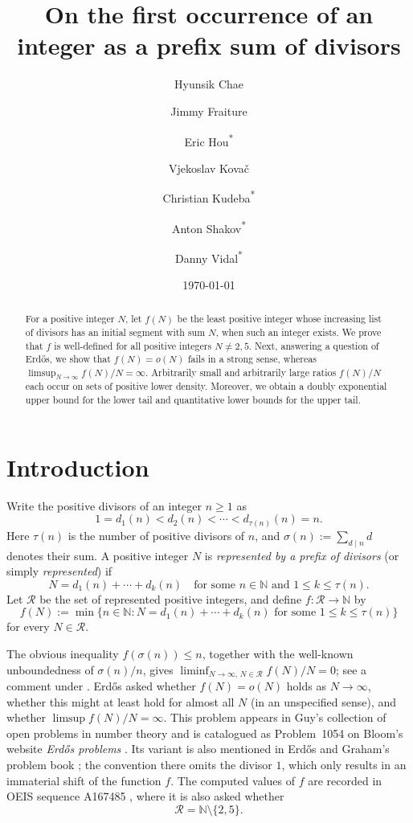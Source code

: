 \documentclass[11pt,letterpaper,reqno]{amsart}
\title{On the first occurrence of an integer as a prefix sum of divisors}
\author[Chae]{Hyunsik Chae}
\author[Fraiture]{Jimmy Fraiture}
\author[Hou]{Eric Hou\textsuperscript{*}}
\author[Kova\v{c}]{Vjekoslav Kova\v{c}}
\author[Kudeba]{Christian Kudeba\textsuperscript{*}}
\author[Shakov]{Anton Shakov\textsuperscript{*}}
\author[Vidal]{Danny Vidal\textsuperscript{*}}
\date{\today}
\numberwithin{equation}{section}
\theoremstyle{remark}
\newcommand{\N}{\mathbb{N}}
\newcommand{\Rcal}{\mathcal{R}}
\newcommand{\1}{\mathbf 1}
\renewcommand{\leq}{\leqslant}
\renewcommand{\geq}{\geqslant}
\begin{document}
\begin{abstract}
For a positive integer $N$, let $f(N)$ be the least positive integer whose increasing list of divisors has an initial segment with sum $N$, when such an integer exists. We prove that $f$ is well-defined for all positive integers $N\neq2,5$. Next, answering a question of Erd\H{o}s, we show that $f(N)=o(N)$ fails in a strong sense, whereas $\limsup_{N\to\infty}f(N)/N=\infty$. Arbitrarily small and arbitrarily large ratios $f(N)/N$ each occur on sets of positive lower density. Moreover, we obtain a doubly exponential upper bound for the lower tail and quantitative lower bounds for the upper tail.
\end{abstract}

\maketitle
\tableofcontents

\section{Introduction}\label{sec:introduction}

Write the positive divisors of an integer $n\geq1$ as
\[
 1=d_1(n)<d_2(n)<\cdots<d_{\tau(n)}(n)=n.
\]
Here $\tau(n)$ is the number of positive divisors of $n$, and
$\sigma(n):=\sum_{d\mid n}d$ denotes their sum.
A positive integer $N$ is \emph{represented by a prefix of divisors} (or simply \emph{represented}) if
\[
 N=d_1(n)+\cdots+d_k(n)
 \quad\text{for some }n\in\N\text{ and } 1\leq k\leq\tau(n).
\]
Let $\Rcal$ be the set of represented positive integers, and define $f\colon\Rcal\to\N$ by
\[
 f(N):=\min\{n\in\N : N=d_1(n)+\cdots+d_k(n)
 \text{ for some }1\leq k\leq\tau(n)\}
\]
for every $N\in\Rcal$.

The obvious inequality $f(\sigma(n))\leq n$, together with the
well-known unboundedness of $\sigma(n)/n$, gives
$\liminf_{N\to\infty,\,N\in\Rcal}f(N)/N=0$; see a comment under \cite{OEIS1054}.
Erd\H{o}s asked whether $f(N)=o(N)$ holds as $N\to\infty$, whether this might at least hold for
almost all $N$ (in an unspecified sense), and whether $\limsup f(N)/N=\infty$.
This problem appears in Guy's collection of open problems in number theory \cite[Problem B2]{Guy} and is
catalogued as Problem~1054 on Bloom's website \emph{Erd\H{o}s problems} \cite{Bloom1054}. Its variant is also mentioned in
Erd\H{o}s and Graham's problem book \cite[p.~93]{ErdosGraham}; the convention there omits the divisor $1$, which only results in an immaterial shift of the function $f$.
The computed values of $f$ are recorded in OEIS sequence A167485 \cite{OEIS1054}, where it is also asked whether
\begin{equation}\label{eq:exact-representability}
 \Rcal=\N\setminus\{2,5\}.
\end{equation}
\end{document}
